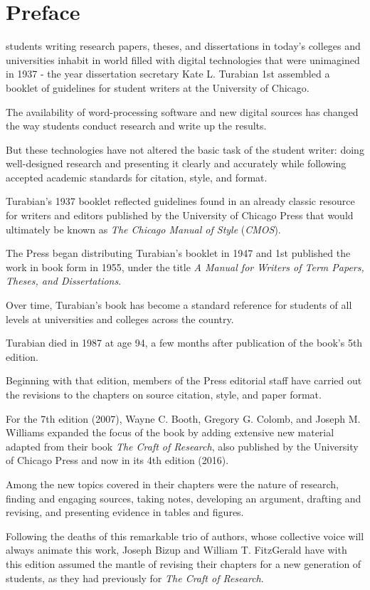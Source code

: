 \documentclass[oneside]{book}
\numberwithin{equation}{section}
\begin{document}
\chapter*{Preface}
students writing research papers, theses, and dissertations in today's colleges and universities inhabit in world filled with digital technologies that were unimagined in 1937 - the year dissertation secretary Kate L. Turabian 1st assembled a booklet of guidelines for student writers at the University of Chicago.

The availability of word-processing software and new digital sources has changed the way students conduct research and write up the results.

But these technologies have not altered the basic task of the student writer: doing well-designed research and presenting it clearly and accurately while following accepted academic standards for citation, style, and format.

%
Turabian's 1937 booklet reflected guidelines found in an already classic resource for writers and editors published by the University of Chicago Press that would ultimately be known as \textit{The Chicago Manual of Style} (\textit{CMOS}).

The Press began distributing Turabian's booklet in 1947 and 1st published the work in book form in 1955, under the title \textit{A Manual for Writers of Term Papers, Theses, and Dissertations}.

Over time, Turabian's book has become a standard reference for students of all levels at universities and colleges across the country.

Turabian died in 1987 at age 94, a few months after publication of the book's 5th edition.

%
Beginning with that edition, members of the Press editorial staff have carried out the revisions to the chapters on source citation, style, and paper format.

For the 7th edition (2007), Wayne C. Booth, Gregory G.
Colomb, and Joseph M. Williams expanded the focus of the book by adding extensive new material adapted from their book \textit{The Craft of Research}, also published by the University of Chicago Press and now in its 4th edition (2016).

Among the new topics covered in their chapters were the nature of research, finding and engaging sources, taking notes, developing an argument, drafting and revising, and presenting evidence in tables and figures.

Following the deaths of this remarkable trio of authors, whose collective voice will always animate this work, Joseph Bizup and William
T. FitzGerald have with this edition assumed the mantle of revising their chapters for a new generation of students, as they had previously for \textit{The Craft of Research}.
\end{document}
